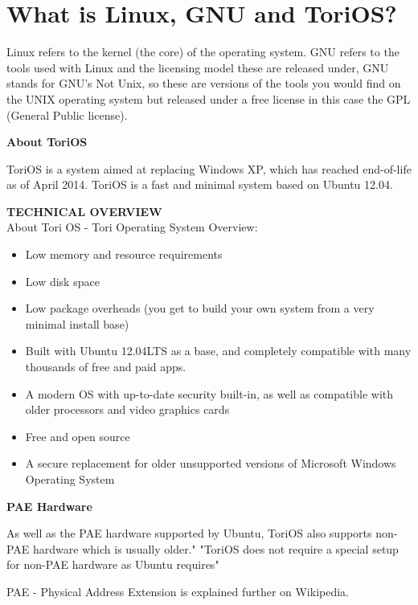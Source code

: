 \documentclass[12pt,a4paper]{book}
\begin{document}
\chapter{What is Linux, GNU and ToriOS?}

Linux refers to the kernel (the core) of the operating system.  GNU refers to the tools used with Linux and the licensing model these are released under,  GNU stands for GNU's Not Unix,  so these are versions of the tools you would find on the UNIX operating system but released under a free license in this case the GPL (General Public license).

\textbf{About ToriOS}

ToriOS \cite{ToriOS} is a system aimed at replacing Windows XP, which has reached end-of-life as of April 2014. ToriOS is a fast and minimal system based on Ubuntu 12.04. 

\textbf{TECHNICAL OVERVIEW} \\
About Tori OS - Tori Operating System Overview:

\begin{itemize}
\item{Low memory and resource requirements}
\item{Low disk space}
\item{Low package overheads (you get to build your own system from a very minimal install base)}
\item{Built with Ubuntu 12.04LTS as a base, and completely compatible with many thousands of free and paid apps.}
\item{ A modern OS with up-to-date security built-in, as well as compatible with older processors and video graphics cards}
\item{Free and open source}
\item{A secure replacement for older unsupported versions of Microsoft Windows Operating System} 
\end{itemize}

\textbf{PAE Hardware}

As well as the PAE hardware supported by Ubuntu, ToriOS also supports non-PAE hardware which is usually older." "ToriOS does not require a special setup for non-PAE hardware as Ubuntu requires" \cite{PAE2}


PAE - Physical Address Extension is explained further on Wikipedia. \cite{PAE} \\
\end{document}
